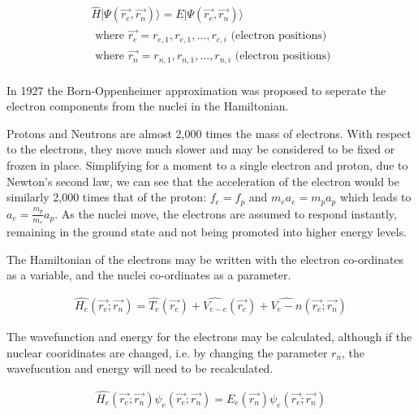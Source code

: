 \begin{equation}
\begin{split}
\hat{H} \lvert \Psi (\vec{r_e}, \vec{r_n}) \rangle = E \lvert \Psi (\vec{r_e}, \vec{r_n}) \rangle \\
\text{ where } \vec{r_e} = r_{e,1}, r_{e,1},...,r_{e,i} \text{ (electron positions)} \\
\text{ where } \vec{r_n} = r_{n,1}, r_{n,1},...,r_{n,i} \text{ (electron positions)} \\
\end{split}
\label{eq:eqTimeIndependentSchrodinger}
\end{equation}

In 1927 the Born-Oppenheimer approximation was proposed to seperate the electron components from the nuclei in the Hamiltonian.  

Protons and Neutrons are almost 2,000 times the mass of electrons.  With respect to the electrons, they move much slower and may be considered to be fixed or frozen in place.  Simplifying for a moment to a single electron and proton, due to Newton's second law, we can see that the acceleration of the electron would be similarly 2,000 times that of the proton: $f_e = f_p$ and $m_e a_e = m_p a_p$ which leads to $a_e = \frac{m_p}{m_e} a_p$.  As the nuclei move, the electrons are assumed to respond instantly, remaining in the ground state and not being promoted into higher energy levels.

The Hamiltonian of the electrons may be written with the electron co-ordinates as a variable, and the nuclei co-ordinates as a parameter.

\begin{equation}
\begin{split}
\hat{H_e} (\vec{r_e}; \vec{r_n}) = \hat{T_e}(\vec{r_e}) + \hat{V_{e-e}}(\vec{r_e}) + \hat{V_e-n}(\vec{r_e}; \vec{r_n})
\end{split}
\label{eq:eqTimeIndependentSchrodinger}
\end{equation}

The wavefunction and energy for the electrons may be calculated, although if the nuclear cooridinates are changed, i.e. by changing the parameter $r_n$, the wavefucntion and energy will need to be recalculated.

\begin{equation}
\begin{split}
\hat{H_e} (\vec{r_e}; \vec{r_n}) \psi_{e} (\vec{r_e}; \vec{r_n}) = E_e (\vec{r_n})  \psi_{e} (\vec{r_e}; \vec{r_n}) 
\end{split}
\label{eq:eqTimeIndependentSchrodinger}
\end{equation}


